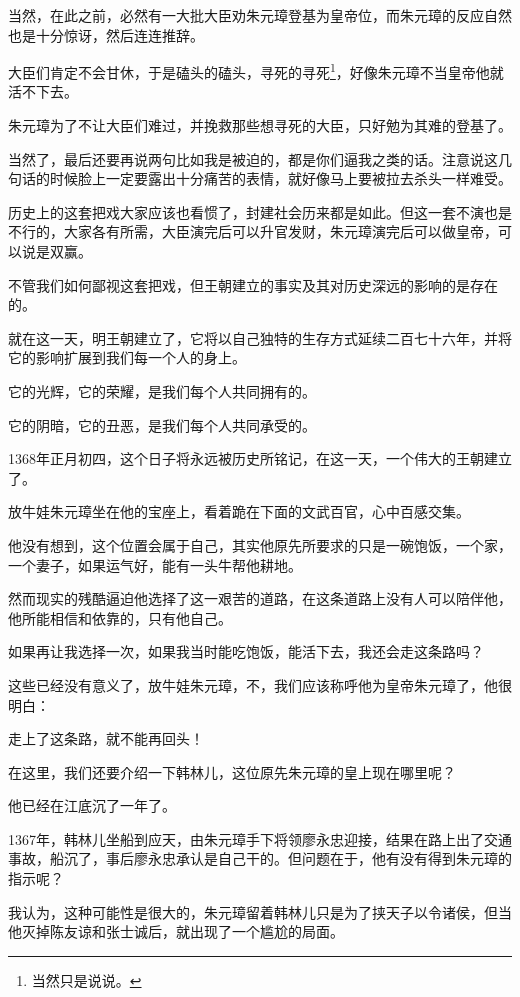 \begin{multicols}{\theparacolNo}
		当然，在此之前，必然有一大批大臣劝朱元璋登基为皇帝位，而朱元璋的反应自然也是十分惊讶，然后连连推辞。

		大臣们肯定不会甘休，于是磕头的磕头，寻死的寻死\footnote{当然只是说说。}，好像朱元璋不当皇帝他就活不下去。

		朱元璋为了不让大臣们难过，并挽救那些想寻死的大臣，只好勉为其难的登基了。

		当然了，最后还要再说两句比如我是被迫的，都是你们逼我之类的话。注意说这几句话的时候脸上一定要露出十分痛苦的表情，就好像马上要被拉去杀头一样难受。

		历史上的这套把戏大家应该也看惯了，封建社会历来都是如此。但这一套不演也是不行的，大家各有所需，大臣演完后可以升官发财，朱元璋演完后可以做皇帝，可以说是双赢。

		不管我们如何鄙视这套把戏，但王朝建立的事实及其对历史深远的影响的是存在的。

		就在这一天，明王朝建立了，它将以自己独特的生存方式延续二百七十六年，并将它的影响扩展到我们每一个人的身上。

		它的光辉，它的荣耀，是我们每个人共同拥有的。

		它的阴暗，它的丑恶，是我们每个人共同承受的。

		1368年正月初四，这个日子将永远被历史所铭记，在这一天，一个伟大的王朝建立了。

		放牛娃朱元璋坐在他的宝座上，看着跪在下面的文武百官，心中百感交集。

		他没有想到，这个位置会属于自己，其实他原先所要求的只是一碗饱饭，一个家，一个妻子，如果运气好，能有一头牛帮他耕地。

		然而现实的残酷逼迫他选择了这一艰苦的道路，在这条道路上没有人可以陪伴他，他所能相信和依靠的，只有他自己。

		如果再让我选择一次，如果我当时能吃饱饭，能活下去，我还会走这条路吗？

		这些已经没有意义了，放牛娃朱元璋，不，我们应该称呼他为皇帝朱元璋了，他很明白：

		走上了这条路，就不能再回头！

		在这里，我们还要介绍一下韩林儿，这位原先朱元璋的皇上现在哪里呢？

		他已经在江底沉了一年了。

		1367年，韩林儿坐船到应天，由朱元璋手下将领廖永忠迎接，结果在路上出了交通事故，船沉了，事后廖永忠承认是自己干的。但问题在于，他有没有得到朱元璋的指示呢？

		我认为，这种可能性是很大的，朱元璋留着韩林儿只是为了挟天子以令诸侯，但当他灭掉陈友谅和张士诚后，就出现了一个尴尬的局面。


\end{multicols}
